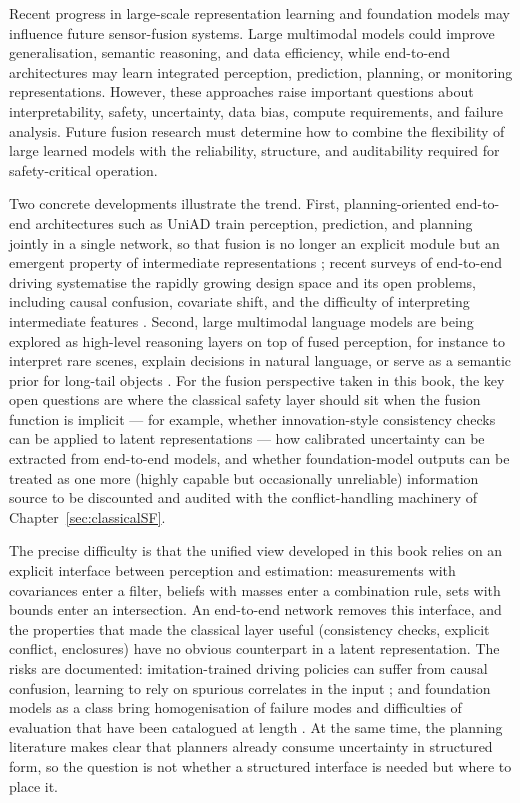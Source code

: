 \documentclass[graybox,envcountchap]{style/SNmono}
\begin{document}
Recent progress in large-scale representation learning and foundation models may influence future sensor-fusion systems. Large multimodal models could improve generalisation, semantic reasoning, and data efficiency, while end-to-end architectures may learn integrated perception, prediction, planning, or monitoring representations. However, these approaches raise important questions about interpretability, safety, uncertainty, data bias, compute requirements, and failure analysis. Future fusion research must determine how to combine the flexibility of large learned models with the reliability, structure, and auditability required for safety-critical operation.

Two concrete developments illustrate the trend. First, planning-oriented end-to-end architectures such as UniAD train perception, prediction, and planning jointly in a single network, so that fusion is no longer an explicit module but an emergent property of intermediate representations \cite{hu2023_uniad}; recent surveys of end-to-end driving systematise the rapidly growing design space and its open problems, including causal confusion, covariate shift, and the difficulty of interpreting intermediate features \cite{chen2024_e2e_survey}. Second, large multimodal language models are being explored as high-level reasoning layers on top of fused perception, for instance to interpret rare scenes, explain decisions in natural language, or serve as a semantic prior for long-tail objects \cite{cui2024_mllm_driving}. For the fusion perspective taken in this book, the key open questions are where the classical safety layer should sit when the fusion function is implicit --- for example, whether innovation-style consistency checks can be applied to latent representations --- how calibrated uncertainty can be extracted from end-to-end models, and whether foundation-model outputs can be treated as one more (highly capable but occasionally unreliable) information source to be discounted and audited with the conflict-handling machinery of Chapter~\ref{sec:classicalSF}.

The precise difficulty is that the unified view developed in this book relies on an explicit interface between perception and estimation: measurements with covariances enter a filter, beliefs with masses enter a combination rule, sets with bounds enter an intersection. An end-to-end network removes this interface, and the properties that made the classical layer useful (consistency checks, explicit conflict, enclosures) have no obvious counterpart in a latent representation. The risks are documented: imitation-trained driving policies can suffer from causal confusion, learning to rely on spurious correlates in the input \cite{dehaan2019_causal_confusion}; and foundation models as a class bring homogenisation of failure modes and difficulties of evaluation that have been catalogued at length \cite{bommasani2021_foundation}. At the same time, the planning literature \cite{schwarting2018_planning} makes clear that planners already consume uncertainty in structured form, so the question is not whether a structured interface is needed but where to place it.
\end{document}
